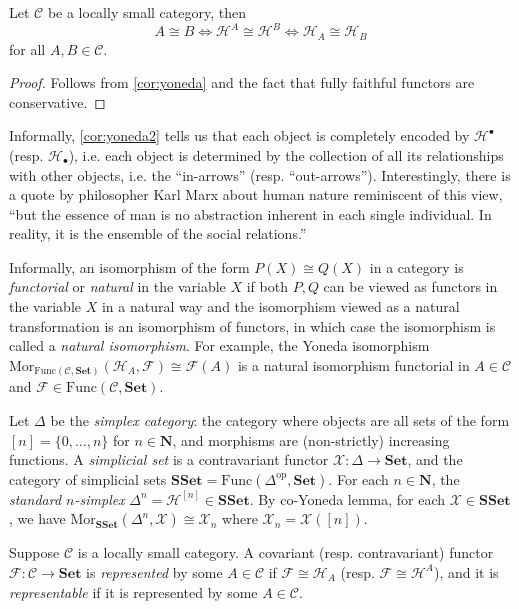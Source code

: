 \documentclass[11pt]{book}
\begin{document}
\begin{corollary}\label{cor:yoneda2}Let $\mathcal C$ be a locally small category, then
\[A\cong B \Longleftrightarrow\mathscr{H}^A\cong\mathscr{H}^B \Longleftrightarrow\mathscr{H}_A\cong\mathscr{H}_B\]
for all $A,B\in\mathcal C$.
\begin{proof}Follows from \autoref{cor:yoneda} and the fact that fully faithful functors are conservative.
\end{proof}
\end{corollary}
\begin{remark}Informally, \autoref{cor:yoneda2} tells us that each object is completely encoded by $\mathscr{H}^\bullet$ (resp. $\mathscr{H}_\bullet$), i.e. each object is determined by the collection of all its relationships with other objects, i.e. the ``in-arrows'' (resp. ``out-arrows''). Interestingly, there is a quote by philosopher Karl Marx about human nature reminiscent of this view, ``but the essence of man is no abstraction inherent in each single individual. In reality, it is the ensemble of the social relations.''
\end{remark}
\begin{remark}Informally, an isomorphism of the form $P(X)\cong Q(X)$ in a category is \textit{functorial} or \textit{natural} in the variable $X$ if both $P,Q$ can be viewed as functors in the variable $X$ in a natural way and the isomorphism viewed as a natural transformation is an isomorphism of functors, in which case the isomorphism is called a \textit{natural isomorphism}. For example, the Yoneda isomorphism $\mathrm{Mor}_{\mathrm{Func}(\mathcal C,\mathbf{Set})}(\mathscr{H}_A,\mathscr{F})\cong \mathscr{F}(A)$ is a natural isomorphism functorial in $A\in\mathcal C$ and $\mathscr{F}\in\mathrm{Func}(\mathcal C,\mathbf{Set})$.
\end{remark}
\begin{example}Let $\Delta$ be the \textit{simplex category}: the category where objects are all sets of the form $[n]=\{0,\dots,n\}$ for $n\in\mathbf N$, and morphisms are (non-strictly) increasing functions. A \textit{simplicial set} is a contravariant functor $\mathscr{X}:\Delta\rightarrow \mathbf{Set}$, and the category of simplicial sets $\mathbf{SSet}=\mathrm{Func}(\Delta^{\mathrm{op}},\mathbf{Set})$. For each $n\in\mathbf N$, the \textit{standard $n$-simplex} $\Delta^n=\mathscr{H}^{[n]}\in\mathbf{SSet}$. By co-Yoneda lemma, for each $\mathscr{X}\in \mathbf{SSet}$, we have $\mathrm{Mor}_{\mathbf{SSet}}(\Delta^n,\mathscr X)\cong \mathscr X_n$ where $\mathscr X_n=\mathscr X([n])$.
\end{example}
\begin{definition}Suppose $\mathcal C$ is a locally small category. A covariant (resp. contravariant) functor $\mathscr{F}:\mathcal C\rightarrow \mathbf{Set}$ is \textit{represented} by some $A\in\mathcal C$ if $\mathscr{F}\cong \mathscr{H}_A$ (resp. $\mathscr{F}\cong \mathscr{H}^A$), and it is \textit{representable} if it is represented by some $A\in\mathcal C$.
\end{definition}
\end{document}
